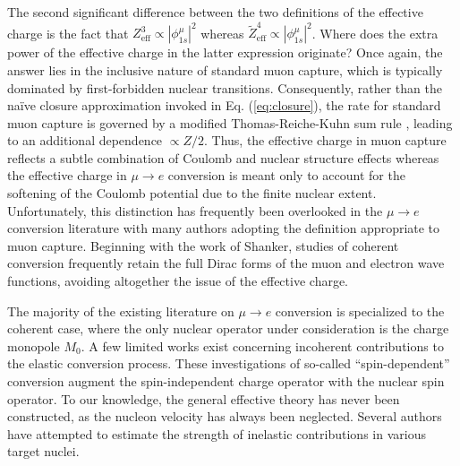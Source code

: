 \documentclass[12pt,letterpaper]{book}
\begin{document}
The second significant difference between the two definitions of the effective charge is the fact that $Z_\mathrm{eff}^3\propto |\phi_{1s}^{\mu}|^2$ whereas $\tilde{Z}_\mathrm{eff}^4\propto |\phi_{1s}^{\mu}|^2$. Where does the extra power of the effective charge in the latter expression originate? Once again, the answer lies in the inclusive nature of standard muon capture, which is typically dominated by first-forbidden nuclear transitions. Consequently, rather than the na\"ive closure approximation invoked in Eq. (\ref{eq:closure}), the rate for standard muon capture is governed by a modified Thomas-Reiche-Kuhn sum rule \cite{DoDang:1972pc}, leading to an additional dependence $\propto Z/2$. Thus, the effective charge in muon capture reflects a subtle combination of Coulomb and nuclear structure effects whereas the effective charge in $\mu\rightarrow e$ conversion is meant only to account for the softening of the Coulomb potential due to the finite nuclear extent. Unfortunately, this distinction has frequently been overlooked in the $\mu\rightarrow e$ conversion literature with many authors adopting the definition appropriate to muon capture. Beginning with the work of Shanker, studies of coherent conversion frequently retain the full Dirac forms of the muon and electron wave functions, avoiding altogether the issue of the effective charge.

The majority of the existing literature on $\mu\rightarrow e$ conversion is specialized to the coherent case, where the only nuclear operator under consideration is the charge monopole $M_0$. A few limited works exist concerning incoherent contributions to the elastic conversion process. These investigations of so-called ``spin-dependent'' conversion augment the spin-independent charge operator with the nuclear spin operator. To our knowledge, the general effective theory has never been constructed, as the nucleon velocity has always been neglected. Several authors have attempted to estimate the strength of inelastic contributions in various target nuclei.
\end{document}
